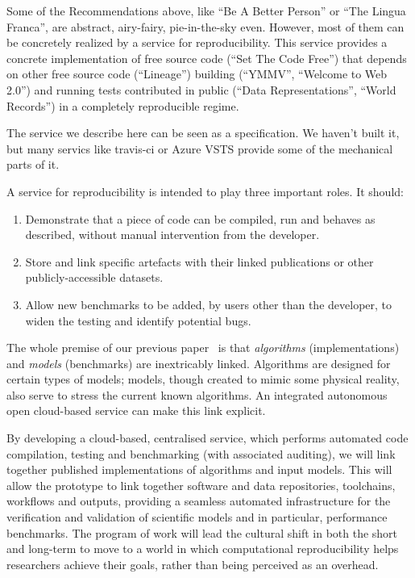 \documentclass[a4paper,11pt]{article}
\begin{document}
Some of the Recommendations above, like ``Be A Better Person'' or
``The Lingua Franca'', are abstract, airy-fairy, pie-in-the-sky
even. However, most of them can be concretely realized by a service
for reproducibility. This service provides a concrete implementation
of free source code (``Set The Code Free'') that depends on other free
source code (``Lineage'') building (``YMMV'', ``Welcome to Web 2.0'')
and running tests contributed in public (``Data Representations'',
``World Records'') in a completely reproducible regime.

The service we describe here can be seen as a specification. We
haven't built it, but many servics like travis-ci or Azure VSTS
provide some of the mechanical parts of it. 

A service for reproducibility is intended to play three important
roles. It should:

\begin{enumerate}
\item Demonstrate that a piece of code can be compiled, run
and behaves as described, without manual intervention from the
developer.
\item Store and link specific artefacts with their linked
publications or other publicly-accessible datasets.
\item Allow new benchmarks to be added, by users other than
the developer, to widen the testing and identify potential bugs.
\end{enumerate}

The whole premise of our previous paper~\cite{crick-et-al_recomp2014}
is that {\emph{algorithms}} (implementations) and {\emph{models}}
(benchmarks) are inextricably linked. Algorithms are designed for
certain types of models; models, though created to mimic some physical
reality, also serve to stress the current known algorithms. An
integrated autonomous open cloud-based service can make this link explicit.

By developing a cloud-based, centralised service, which performs
automated code compilation, testing and benchmarking (with associated
auditing), we will link together published implementations of
algorithms and input models. This will allow the prototype to link
together software and data repositories, toolchains, workflows and
outputs, providing a seamless automated infrastructure for the
verification and validation of scientific models and in particular,
performance benchmarks. The program of work will lead the cultural
shift in both the short and long-term to move to a world in which
computational reproducibility helps researchers achieve their goals,
rather than being perceived as an overhead.
\end{document}

